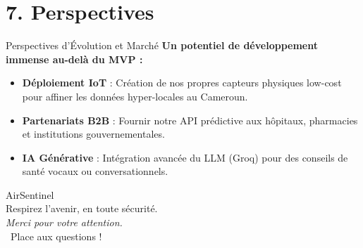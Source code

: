 \documentclass[10pt, aspectratio=169]{beamer}
\begin{document}
\section{7. Perspectives}
\begin{frame}{Perspectives d'Évolution et Marché}
  \textbf{Un potentiel de développement immense au-delà du MVP :}
  \vspace{0.3cm}
  \begin{itemize}
    \item \textbf{Déploiement IoT} : Création de nos propres capteurs physiques low-cost pour affiner les données hyper-locales au Cameroun.
    \item \textbf{Partenariats B2B} : Fournir notre API prédictive aux hôpitaux, pharmacies et institutions gouvernementales.
    \item \textbf{IA Générative} : Intégration avancée du LLM (Groq) pour des conseils de santé vocaux ou conversationnels.
  \end{itemize}
\end{frame}

\begin{frame}[standout]
  AirSentinel \\
  \vspace{0.5cm}
  \normalsize Respirez l'avenir, en toute sécurité. \\
  \vspace{0.5cm}
  \textit{Merci pour votre attention.} \\
  \vspace{0.5cm}
  \faQuestionCircle \ Place aux questions !
\end{frame}
\end{document}
